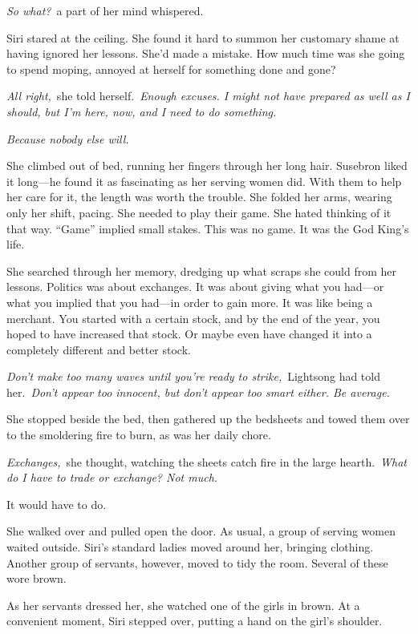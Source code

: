\textit{So what?}~a part of her mind whispered.

Siri stared at the ceiling. She found it hard to summon her customary shame at having ignored her lessons. She’d made a mistake. How much time was she going to spend moping, annoyed at herself for something done and gone?

\textit{All right,}~she told herself.~\textit{Enough excuses. I might not have prepared as well as I should, but I’m here, now, and I need to do something.}

\textit{Because nobody else will.}

She climbed out of bed, running her fingers through her long hair. Susebron liked it long—he found it as fascinating as her serving women did. With them to help her care for it, the length was worth the trouble. She folded her arms, wearing only her shift, pacing. She needed to play their game. She hated thinking of it that way. “Game” implied small stakes. This was no game. It was the God King’s life.

She searched through her memory, dredging up what scraps she could from her lessons. Politics was about exchanges. It was about giving what you had—or what you implied that you had—in order to gain more. It was like being a merchant. You started with a certain stock, and by the end of the year, you hoped to have increased that stock. Or maybe even have changed it into a completely different and better stock.

\textit{Don’t make too many waves until you’re ready to strike,}~Lightsong had told her.~\textit{Don’t appear too innocent, but don’t appear too smart either. Be average.}

She stopped beside the bed, then gathered up the bedsheets and towed them over to the smoldering fire to burn, as was her daily chore.

\textit{Exchanges,}~she thought, watching the sheets catch fire in the large hearth.~\textit{What do I have to trade or exchange? Not much.}

It would have to do.

She walked over and pulled open the door. As usual, a group of serving women waited outside. Siri’s standard ladies moved around her, bringing clothing. Another group of servants, however, moved to tidy the room. Several of these wore brown.

As her servants dressed her, she watched one of the girls in brown. At a convenient moment, Siri stepped over, putting a hand on the girl’s shoulder.

